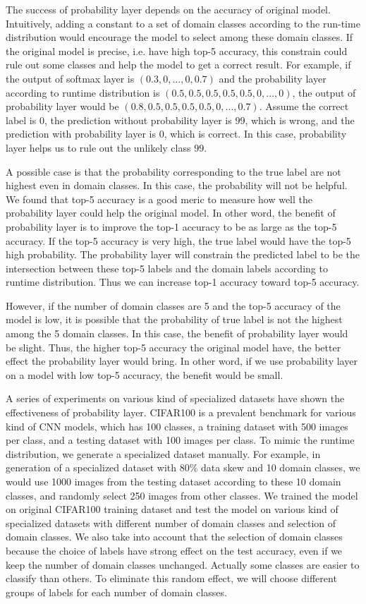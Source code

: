 \documentclass{article}
\begin{document}
The success of probability layer depends on the accuracy of original model. Intuitively, adding a constant to a set of domain classes according to the run-time distribution would encourage the model to select among these domain classes. If the original model is precise, i.e. have high top-5 accuracy, this constrain could rule out some classes and help the model to get a correct result. For example, if the output of softmax layer is $(0.3, 0, ..., 0, 0.7)$ and the probability layer according to runtime distribution is $(0.5, 0.5, 0.5, 0.5, 0.5, 0, ..., 0)$, the output of probability layer would be $(0.8, 0.5, 0.5, 0.5, 0.5, 0, ..., 0.7)$. Assume the correct label is $0$,  the prediction without probability layer is $99$, which is wrong, and the prediction with probability layer is $0$, which is correct. In this case, probability layer helps us to rule out the unlikely class $99$.

A possible case is that the probability corresponding to the true label are not highest even in domain classes. In this case, the probability will not be helpful. We found that top-5 accuracy is a good meric to measure how well the probability layer could help the original model. In other word, the benefit of probability layer is to improve the top-1 accuracy to be as large as the top-5 accuracy. If the top-5 accuracy is very high, the true label would have the top-5 high probability. The probability layer will constrain the predicted label to be the intersection between these top-5 labels and the domain labels according to runtime distribution. Thus we can increase top-1 accuracy toward top-5 accuracy. 

However, if the number of domain classes are 5 and the top-5 accuracy of the model is low, it is possible that the probability of true label is not the highest among the 5 domain classes. In this case, the benefit of probability layer would be slight. Thus, the higher top-5 accuracy the original model have, the better effect the probability layer would bring. In other word, if we use probability layer on a model with low top-5 accuracy, the benefit would be small. 

A series of experiments on various kind of specialized datasets have shown the effectiveness of probability layer. CIFAR100 is a prevalent benchmark for various kind of CNN models, which has 100 classes, a training dataset with 500 images per class, and a testing dataset with 100 images per class. To mimic the runtime distribution, we generate a specialized dataset manually. For example, in generation of a specialized dataset with 80\% data skew and 10 domain classes, we would use 1000 images from the testing dataset according to these 10 domain classes, and randomly select 250 images from other classes. We trained the model on original CIFAR100 training dataset and test the model on various kind of specialized datasets with different number of domain classes and selection of domain classes. We also take into account that the selection of domain classes because the choice of labels have strong effect on the test accuracy, even if we keep the number of domain classes unchanged. Actually some classes are easier to classify than others. To eliminate this random effect, we will choose different groups of labels for each number of domain classes.
\end{document}
